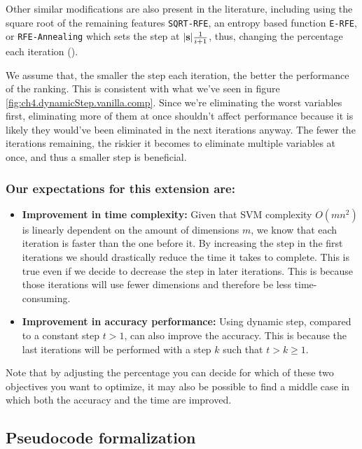 Other similar modifications are also present in the literature, including using the square root of the remaining features \texttt{SQRT-RFE}, an entropy based function \texttt{E-RFE}, or \texttt{RFE-Annealing} which sets the step at $|\mathbf{s}| \frac{1}{i+1}$, thus, changing the percentage each iteration (\cite{ding_improving_2006}).

We assume that, the smaller the step each iteration, the better the performance of the ranking. This is consistent with what we've seen in figure \ref{fig:ch4.dynamicStep.vanilla.comp}. Since we're eliminating the worst variables first, eliminating more of them at once shouldn't affect performance because it is likely they would've been eliminated in the next iterations anyway. The fewer the iterations remaining, the riskier it becomes to eliminate multiple variables at once, and thus a smaller step is beneficial.

\subsubsection*{Our expectations for this extension are:}

\begin{itemize}
    \item \textbf{Improvement in time complexity:} Given that SVM complexity $O(mn^2)$ is lin\-ear\-ly dependent on the amount of dimensions $m$, we know that each iteration is faster than the one before it. By increasing the step in the first iterations we should drastically reduce the time it takes to complete. This is true even if we decide to decrease the step in later iterations. This is because those iterations will use fewer dimensions and therefore be less time-consuming.
    \item \textbf{Improvement in accuracy performance:} Using dynamic step, compared to a constant step $t > 1$, can also improve the accuracy. This is because the last iterations will be performed with a step $k$ such that $t > k \ge 1$.
\end{itemize}

Note that by adjusting the percentage you can decide for which of these two objectives you want to optimize, it may also be possible to find a middle case in which both the accuracy and the time are improved.

\subsection{Pseudocode formalization}

